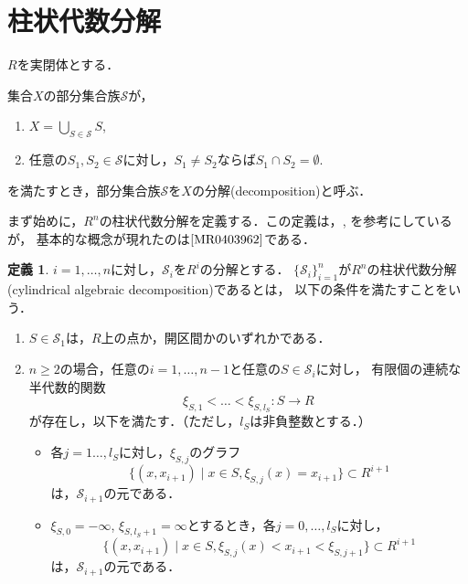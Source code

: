 \documentclass[uplatex, dvipdfmx]{jsarticle}
\numberwithin{equation}{section}
\newcommand{\map}[3]{{#1}\colon{#2}\rightarrow{#3}}
\theoremstyle{definition}
\newtheorem{definition}{定義}[section]
\begin{document}
\section{柱状代数分解}

$R$を実閉体とする．

集合$X$の部分集合族$\mathcal{S}$が，
\begin{enumerate}
     \item $X = \bigcup_{S \in \mathcal{S}} S$,
     \item 任意の$S_1, S_2 \in \mathcal{S}$に対し，$S_1 \neq S_2$ならば$S_1 \cap S_2 = \emptyset$.
\end{enumerate}
を満たすとき，部分集合族$\mathcal{S}$を$X$の分解(decomposition)と呼ぶ．

まず始めに，$R^n$の柱状代数分解を定義する．この定義は，\cite{MR0764184}, \cite[Definition 5.1.]{MR2248869}を参考にしているが，
基本的な概念が現れたのは$\cite{MR0403962}$である．

\begin{definition} \label{definition:cad}
     $i=1, \dots, n$に対し，$\mathcal{S}_i$を$R^i$の分解とする．
     $\{\mathcal{S}_i\}_{i=1}^n$が$R^n$の柱状代数分解(cylindrical algebraic decomposition)であるとは，
     以下の条件を満たすことをいう．
     \begin{enumerate}
          \item $S \in \mathcal{S}_1$は，$R$上の点か，開区間かのいずれかである．
          \item $n\geq 2$の場合，任意の$i=1, \dots, n-1$と任意の$S \in \mathcal{S}_i$に対し，
          有限個の連続な半代数的関数
          \begin{equation}
               \map{\xi_{S,1}< \dots <\xi_{S,l_S}}{S}{R}
          \end{equation}
          が存在し，以下を満たす．（ただし，$l_S$は非負整数とする．）
          \begin{itemize}
               \item 各$j=1 \dots, l_S$に対し，$\xi_{S,j}$のグラフ
               \begin{equation}
                    \{(x,x_{i+1}) \mid x \in S, \xi_{S,j}(x)=x_{i+1} \} \subset R^{i+1}
               \end{equation}
               は，$\mathcal{S}_{i+1}$の元である．
               \item $\xi_{S,0}=-\infty$, $\xi_{S,l_S+1}=\infty$とするとき，各$j=0, \dots, l_S$に対し，\label{cad_condition1}
               \begin{equation}
                    \{(x,x_{i+1}) \mid x \in S, \xi_{S,j}(x)<x_{i+1}<\xi_{S,j+1} \} \subset R^{i+1}
               \end{equation}
               は，$\mathcal{S}_{i+1}$の元である．
          \end{itemize}
     \end{enumerate}
\end{definition}
\end{document}
